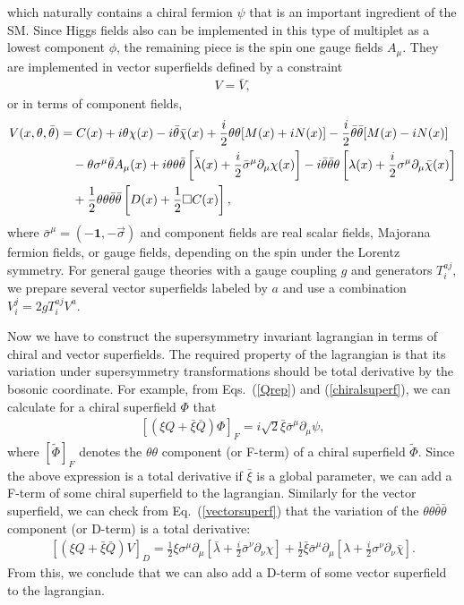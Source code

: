 \documentclass[12pt,twoside,book]{article}
\begin{document}
which naturally contains a chiral fermion $\psi$ that is an important
ingredient of the SM.  Since Higgs fields also can be implemented in
this type of multiplet as a lowest component $\phi$, the remaining
piece is the spin one gauge fields $A_\mu$.  They are implemented in
vector superfields defined by a constraint
\begin{align}
 V = \bar{V},
\end{align}
or in terms of component fields,
\begin{align}
 V(x,\theta,\bar{\theta}) &= C(x) + i\theta\chi(x) -
 i\bar{\theta}\bar{\chi}(x) + \frac{i}{2}\theta\theta [M(x) + iN(x)] -
 \frac{i}{2} \bar{\theta}\bar{\theta} [M(x) - iN(x)] \notag \\
 &\quad - \theta \sigma^\mu \bar{\theta} A_\mu(x) +
 i\theta\theta\bar{\theta} \left[ \bar{\lambda}(x) +
 \frac{i}{2}\bar{\sigma}^\mu \partial_\mu \chi(x) \right] -
 i\bar{\theta}\bar{\theta}\theta \left[ \lambda(x) + \frac{i}{2}
 \sigma^\mu \partial_\mu \bar{\chi}(x) \right] \notag \\
 &\quad + \frac{1}{2} \theta\theta\bar{\theta}\bar{\theta}\left[ D(x) +
 \frac{1}{2}\Box C(x)\right],\label{vectorsuperf}
\end{align}
where $\bar{\sigma}^\mu = (-\textbf{1},-\vec{\sigma})$ and component
fields are real scalar fields, Majorana fermion fields, or gauge
fields, depending on the spin under the Lorentz symmetry.  For general
gauge theories with a gauge coupling $g$ and generators $T^{aj}_i$, we
prepare several vector superfields labeled by $a$ and use a
combination $V_i^j = 2gT^{aj}_i V^a$.

Now we have to construct the supersymmetry invariant lagrangian in
terms of chiral and vector superfields.  The required property of the
lagrangian is that its variation under supersymmetry transformations
should be total derivative by the bosonic coordinate.  For example,
from Eqs.\ (\ref{Qrep}) and (\ref{chiralsuperf}), we can calculate for
a chiral superfield $\Phi$ that
\begin{align}
 \left[ (\xi Q + \bar{\xi} \bar{Q}) \Phi \right]_F
 = i\sqrt{2} \bar{\xi} \bar{\sigma}^\mu \partial_\mu \psi,
\end{align}
where $[\tilde{\Phi}]_F$ denotes the $\theta\theta$ component (or
F-term) of a chiral superfield $\tilde{\Phi}$.  Since the above
expression is a total derivative if $\bar{\xi}$ is a global parameter,
we can add a F-term of some chiral superfield to the lagrangian.
Similarly for the vector superfield, we can check from Eq.\
(\ref{vectorsuperf}) that the variation of the
$\theta\theta\bar{\theta}\bar{\theta}$ component (or D-term) is a
total derivative:
\begin{align}
 \left[ (\xi Q + \bar{\xi} \bar{Q}) V \right]_D = \frac{1}{2} \xi
 \sigma^\mu \partial_\mu \left[ \bar{\lambda} + \frac{i}{2}
 \bar{\sigma}^\nu \partial_\nu \chi \right] + \frac{1}{2} \bar{\xi}
 \bar{\sigma}^\mu \partial_\mu \left[ \lambda + \frac{i}{2} \sigma^\nu
 \partial_\nu \bar{\chi}\right].
\end{align}
From this, we conclude that we can also add a D-term of some vector
superfield to the lagrangian.
\end{document}
